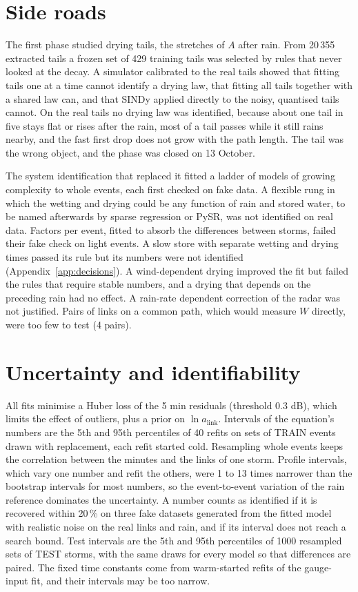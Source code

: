 \documentclass[reprint,aps,pra,amsmath,amssymb,nofootinbib,superscriptaddress]{revtex4-2}
\newcommand{\alink}{a_{\mathrm{link}}}
\begin{document}
\section{Side roads}
\label{app:side}
The first phase studied drying tails, the stretches of $A$ after rain. From 20\,355 extracted tails a frozen set of 429
training tails was selected by rules that never looked at the decay. A simulator calibrated to the real tails showed that
fitting tails one at a time cannot identify a drying law, that fitting all tails together with a shared law can, and that
SINDy \cite{brunton2016} applied directly to the noisy, quantised tails cannot. On the real tails no drying law was
identified, because about one tail in five stays flat or rises after the rain, most of a tail passes while it still rains
nearby, and the fast first drop does not grow with the path length. The tail was the wrong object, and the phase was closed
on 13 October.

The system identification that replaced it fitted a ladder of models of growing complexity to whole events, each first
checked on fake data. A flexible rung in which the wetting and drying could be any function of rain and stored water, to be
named afterwards by sparse regression or PySR, was not identified on real data. Factors per event, fitted to absorb the
differences between storms, failed their fake check on light events. A slow store with separate wetting and drying times
passed its rule but its numbers were not identified (Appendix~\ref{app:decisions}). A wind-dependent drying improved the
fit but failed the rules that require stable numbers, and a drying that depends on the preceding rain had no effect. A
rain-rate dependent correction of the radar was not justified. Pairs of links on a common path, which would measure $W$
directly, were too few to test (4 pairs).

\section{Uncertainty and identifiability}
\label{app:uncertainty}
All fits minimise a Huber loss of the 5 min residuals (threshold 0.3 dB), which limits the effect of outliers, plus a prior
on $\ln\alink$. Intervals of the equation's numbers are the 5th and 95th percentiles of 40 refits on sets of TRAIN events
drawn with replacement, each refit started cold. Resampling whole events keeps the correlation between the minutes and the
links of one storm. Profile intervals, which vary one number and refit the others, were 1 to 13 times narrower than the
bootstrap intervals for most numbers, so the event-to-event variation of the rain reference dominates the uncertainty. A
number counts as identified if it is recovered within 20\,\% on three fake datasets generated from the fitted model with
realistic noise on the real links and rain, and if its interval does not reach a search bound. Test intervals are the 5th
and 95th percentiles of 1000 resampled sets of TEST storms, with the same draws for every model so that differences are
paired. The fixed time constants come from warm-started refits of the gauge-input fit, and their intervals may be too
narrow.
\end{document}
